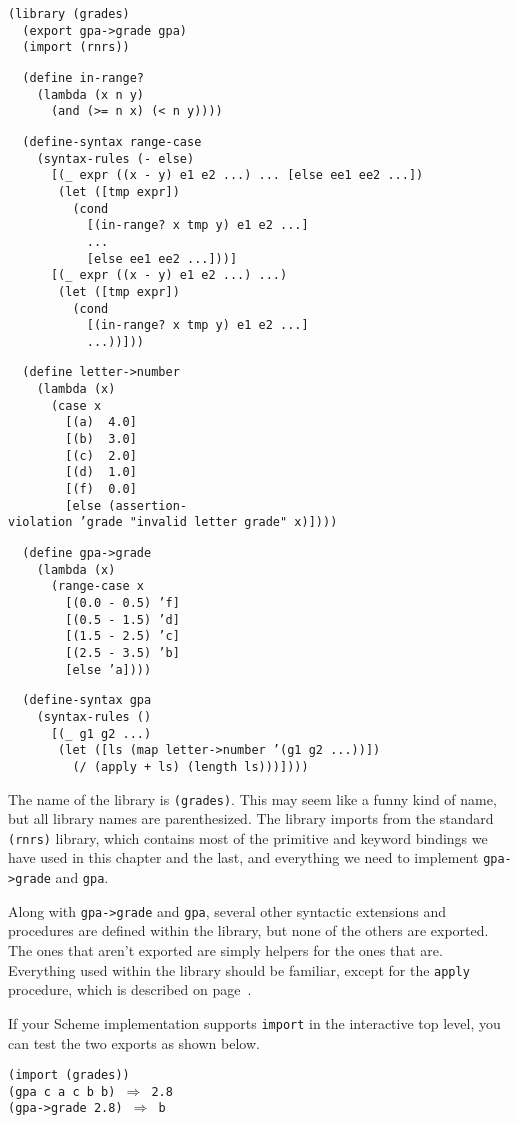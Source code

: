 \begin{alltt}
(library (grades)
  (export gpa-\textgreater{}grade gpa)
  (import (rnrs))

  (define in-range?
    (lambda (x n y)
      (and (\textgreater{}= n x) (\textless{} n y))))

  (define-syntax range-case 
    (syntax-rules (- else)
      [(\_{} expr ((x - y) e1 e2 ...) ... [else ee1 ee2 ...])
       (let ([tmp expr])
         (cond
           [(in-range? x tmp y) e1 e2 ...]
           ...
           [else ee1 ee2 ...]))]
      [(\_{} expr ((x - y) e1 e2 ...) ...)
       (let ([tmp expr])
         (cond
           [(in-range? x tmp y) e1 e2 ...]
           ...))]))

  (define letter-\textgreater{}number
    (lambda (x)
      (case x
        [(a)  4.0]
        [(b)  3.0]
        [(c)  2.0]
        [(d)  1.0]
        [(f)  0.0]
        [else (assertion-violation 'grade "invalid letter grade" x)])))

  (define gpa-\textgreater{}grade
    (lambda (x)
      (range-case x
        [(0.0 - 0.5) 'f]
        [(0.5 - 1.5) 'd]
        [(1.5 - 2.5) 'c]
        [(2.5 - 3.5) 'b]
        [else 'a])))

  (define-syntax gpa
    (syntax-rules ()
      [(\_{} g1 g2 ...)
       (let ([ls (map letter-\textgreater{}number '(g1 g2 ...))])
         (/ (apply + ls) (length ls)))])))
\end{alltt}


The name of the library is \texttt{(grades)}.
This may seem like a funny kind of name, but all library names are
parenthesized.
The library imports from the standard \texttt{(rnrs)} library,
which contains most of the primitive and keyword bindings we have
used in this chapter and the last, and everything we need to
implement \texttt{gpa-\textgreater{}grade} and \texttt{gpa}.


Along with \texttt{gpa-\textgreater{}grade} and \texttt{gpa}, several other
syntactic extensions and procedures are defined within the library,
but none of the others are exported.
The ones that aren't exported are simply helpers for the ones
that are.
Everything used within the library should be familiar, except
for the \texttt{apply} procedure, which is described on
page \pageref{control_desc_apply}.


If your Scheme implementation supports \texttt{import} in the interactive
top level, you can test the two exports as shown below.


\begin{alltt}
(import (grades))
(gpa c a c b b) \(\Rightarrow\) 2.8
(gpa-\textgreater{}grade 2.8) \(\Rightarrow\) b
\end{alltt}


